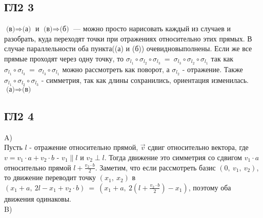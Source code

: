 		\subsection{ГЛ2 3}		
		$\text{(в)} \Rightarrow \text{(а)}$ и $\text{(в)} \Rightarrow \text{(б)}$ --- можно просто нарисовать каждый из случаев и разобрать, куда переходят точки при отражениях относительно этих прямых. В случае параллельности оба пункта((а) и (б)) очевидновыполнены. Если же все прямые проходят через одну точку, то $\sigma_{l_1} \circ \sigma_{l_2} \circ \sigma_{l_3} \: = \: \sigma_{l_3} \circ \sigma_{l_2} \circ \sigma_{l_1}$ так как $\sigma_{l_1} \circ \sigma_{l_3} \: = \: \sigma_{l_3} \circ \sigma_{l_1}$ можно рассмотреть как поворот, а $\sigma_{l_2}$ - отражение. Также $\sigma_{l_1} \circ \sigma_{l_2} \circ \sigma_{l_3}$ - симметрия, так как длины сохранились, ориентация изменилась.\\
		$\text{(а)} \Rightarrow \text{(в)}$ 
		
		
		\subsection{ГЛ2 4}		
		A)\\
		Пусть $l$ - отражение относительно прямой, $\overrightarrow{v}$ сдвиг относительно вектора, где $v = v_1 \cdot a + v_2 \cdot b$ - $v_1 \parallel l$ и $v_2 \perp l$. Тогда движение это симметрия со сдвигом $v_1 \cdot a$ относительно прямой $l + \frac{v_2 \cdot b}{2}$. Заметим, что если рассмотреть базис $(0,\: v_1,\:  v_2)$, то движение переводит точку $(x_1,\:  x_2)$ в $(x_1 + a,\:  2l - x_1 + v_2 \cdot b) \: = \: (x_1 + a,\:  2(l + \frac{v_2 \cdot b}{2}) - x_1)$, поэтому оба движения одинаковы.
		\\
		B)\\
		\\
